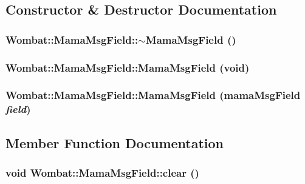 \subsection{Constructor \& Destructor Documentation}
\hypertarget{classWombat_1_1MamaMsgField_a97ac3b0c0677a4b744523af7606f4cdd}{
\subsubsection[{$\sim$MamaMsgField}]{\setlength{\rightskip}{0pt plus 5cm}Wombat::MamaMsgField::$\sim$MamaMsgField ()}}
\label{classWombat_1_1MamaMsgField_a97ac3b0c0677a4b744523af7606f4cdd}
\hypertarget{classWombat_1_1MamaMsgField_a39f4e2d29d9938b38ed02e02ac8f1a40}{
\subsubsection[{MamaMsgField}]{\setlength{\rightskip}{0pt plus 5cm}Wombat::MamaMsgField::MamaMsgField (void)}}
\label{classWombat_1_1MamaMsgField_a39f4e2d29d9938b38ed02e02ac8f1a40}
\hypertarget{classWombat_1_1MamaMsgField_aa20d786a608ee1174855db1b21a8f614}{
\subsubsection[{MamaMsgField}]{\setlength{\rightskip}{0pt plus 5cm}Wombat::MamaMsgField::MamaMsgField (mamaMsgField {\em field})}}
\label{classWombat_1_1MamaMsgField_aa20d786a608ee1174855db1b21a8f614}


\subsection{Member Function Documentation}
\hypertarget{classWombat_1_1MamaMsgField_a30bae12984e55846dd76bd63e8d273ab}{
\subsubsection[{clear}]{\setlength{\rightskip}{0pt plus 5cm}void Wombat::MamaMsgField::clear ()}}
\label{classWombat_1_1MamaMsgField_a30bae12984e55846dd76bd63e8d273ab}


